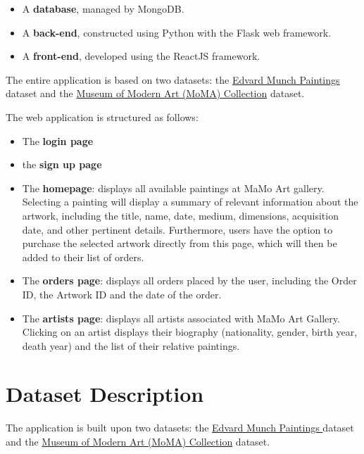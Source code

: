\documentclass[a4paper,12pt]{article}
\begin{document}
\begin{itemize}
      \item A \textbf{database}, managed by MongoDB.
      \item A \textbf{back-end}, constructed using Python with the Flask web framework.
      \item A \textbf{front-end}, developed using the ReactJS framework.
\end{itemize}

The entire application is based on two datasets: the \href{https://www.kaggle.com/datasets/isaienkov/edvard-munch-paintings}{Edvard Munch Paintings } dataset and the \href{https://www.kaggle.com/datasets/momanyc/museum-collection?select=artworks.csv}{Museum of Modern Art (MoMA) Collection} dataset.

The web application is structured as follows:

\begin{itemize}
      \item The \textbf{login page}
      \item the \textbf{sign up page}

      \item The \textbf{homepage}: displays all available paintings at MaMo Art gallery. Selecting a painting will display a summary of relevant information about the artwork, including the title, name, date, medium, dimensions, acquisition date, and other pertinent details. Furthermore, users have the option to purchase the selected artwork directly from this page, which will then be added to their list of orders.

      \item The \textbf{orders page}: displays all orders placed by the user, including the Order ID, the Artwork ID and the date of the order.

      \item The \textbf{artists page}:  displays all artists associated with MaMo Art Gallery. Clicking on an artist displays their biography (nationality, gender, birth year, death year) and the list of their relative paintings.

\end{itemize}

\newpage
\section{Dataset Description}
\justify

The application is built upon two datasets: the \href{https://www.kaggle.com/datasets/isaienkov/edvard-munch-paintings}{Edvard Munch Paintings } dataset and the \href{https://www.kaggle.com/datasets/momanyc/museum-collection?select=artworks.csv}{Museum of Modern Art (MoMA) Collection} dataset.
\end{document}
